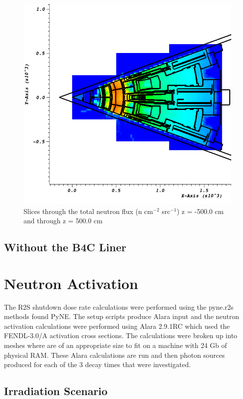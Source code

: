 \documentclass[12pt]{article}
\begin{document}
\begin{figure}[ht!]
  \includegraphics[scale=0.27]{../plots/neutron/b4c/flux_z500.png}
  \caption{Slices through the total neutron flux (n cm$^{-2}$ src$^{-1}$) z = -500.0 cm and through z = 500.0 cm}
  \label{fig:wwinp}
\end{figure}

\subsection{Without the B4C Liner}
\section{Neutron Activation}
The R2S shutdown dose rate calculations were performed using the pyne.r2s methods found PyNE. The setup scripts produce Alara input
and the neutron activation calculations were performed using Alara 2.9.1RC which used the FENDL-3.0/A activation cross sections.
The calculations were broken up into meshes where are of an appropriate size to fit on a machine with 24 Gb of physical RAM. These
Alara calculations are run and then photon sources produced for each of the 3 decay times that were investigated.

\subsection{Irradiation Scenario}
\end{document}
